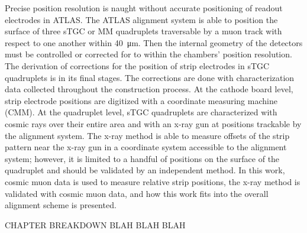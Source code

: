 Precise position resolution is naught without accurate positioning of readout electrodes in ATLAS. The ATLAS alignment system is able to position the surface of three sTGC or MM quadruplets traversable by a muon track with respect to one another within \SI{40}{\micro\meter}. Then the internal geometry of the detectors must be controlled or corrected for to within the chambers' position resolution. The derivation of corrections for the position of strip electrodes in sTGC quadruplets is in its final stages. The corrections are done with characterization data collected throughout the construction process. At the cathode board level, strip electrode positions are digitized with a coordinate measuring machine (CMM). At the quadruplet level, sTGC quadruplets are characterized with cosmic rays over their entire area and with an x-ray gun at positions trackable by the alignment system. The x-ray method is able to measure offsets of the strip pattern near the x-ray gun in a coordinate system accessible to the alignment system; however, it is limited to a handful of positions on the surface of the quadruplet and should be validated by an independent method. In this work, cosmic muon data is used to measure relative strip positions, the x-ray method is validated with cosmic muon data, and how this work fits into the overall alignment scheme is presented.

CHAPTER BREAKDOWN BLAH BLAH BLAH

